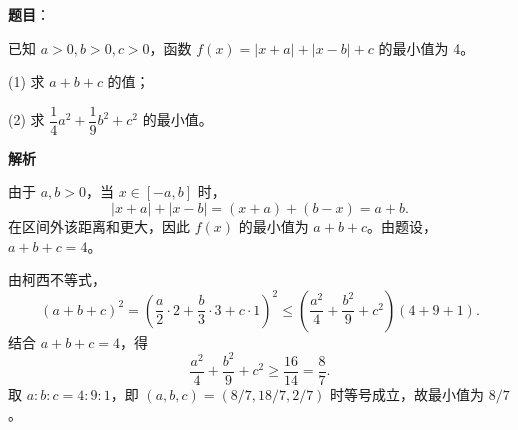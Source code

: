 \begin{answer}

\textbf{题目}：

已知 $a>0,b>0,c>0$，函数 $f(x)=|x+a|+|x-b|+c$ 的最小值为 4。

(1) 求 $a+b+c$ 的值；

(2) 求 $\dfrac14a^2+\dfrac19b^2+c^2$ 的最小值。

\textbf{解析}


由于 $a,b>0$，当 $x\in[-a,b]$ 时，
\nopagebreak[4]
\[
|x+a|+|x-b|=(x+a)+(b-x)=a+b.
\]
在区间外该距离和更大，因此 $f(x)$ 的最小值为 $a+b+c$。由题设，$a+b+c=4$。


由柯西不等式，
\nopagebreak[4]
\[
\left(a+b+c\right)^2
=\left(\frac a2\cdot2+\frac b3\cdot3+c\cdot1\right)^2
\leqslant\left(\frac{a^2}{4}+\frac{b^2}{9}+c^2\right)(4+9+1).
\]
结合 $a+b+c=4$，得
\nopagebreak[4]
\[
\frac{a^2}{4}+\frac{b^2}{9}+c^2\geqslant\frac{16}{14}=\frac87.
\]
取 $a:b:c=4:9:1$，即 $(a,b,c)=(8/7,18/7,2/7)$ 时等号成立，故最小值为 $8/7$。



\end{answer}